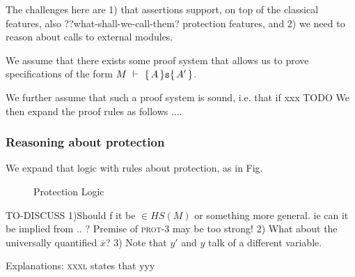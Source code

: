 The challenges here are 1) that \AssertLang assertions support, on top of the classical features, also ??what-shall-we-call-them? protection features, and 2) we need to reason about calls to external modules.


We assume that there exists some
proof system  that   allows us to prove 
 specifications of the form  $M\ \vdash\ \{\,A\, \} {\texttt{s}} \{\,A'\, \}$.
{We further assume that such a proof system is sound, i.e. that 
if xxx TODO 
 We then expand the proof rules as follows ....

\subsubsection{Reasoning about protection}
We expand that logic with rules about protection, as in Fig. 

\begin{figure}[hbt]
\footnotesize
{}
\caption{Protection Logic}
\label{f:protection}
\end{figure}

TO-DISCUSS 1)Should f it be $\in HS(M)$ or something more general. ie can it be implied from .. ? Premise of  \textsc{prot-3} may be too strong!
2) What about the universally quantified $\overline x$? 3)  Note that $y'$ and $y$ talk of a different variable.
 

Explanations: \textsc{xxxl} states that   yyy
  
}
